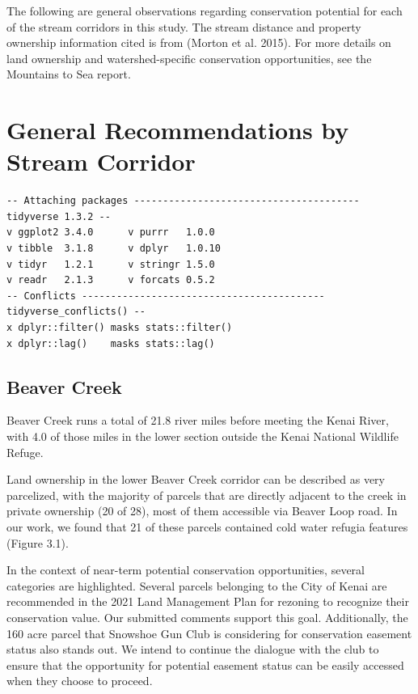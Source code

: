 \documentclass[
  letterpaper,
  DIV=11,
  numbers=noendperiod]{scrreprt}
\begin{document}
The following are general observations regarding conservation potential
for each of the stream corridors in this study. The stream distance and
property ownership information cited is from (Morton et al. 2015). For
more details on land ownership and watershed-specific conservation
opportunities, see the Mountains to Sea report.

\hypertarget{general-recommendations-by-stream-corridor}{%
\section{General Recommendations by Stream
Corridor}\label{general-recommendations-by-stream-corridor}}

\begin{verbatim}
-- Attaching packages --------------------------------------- tidyverse 1.3.2 --
v ggplot2 3.4.0      v purrr   1.0.0 
v tibble  3.1.8      v dplyr   1.0.10
v tidyr   1.2.1      v stringr 1.5.0 
v readr   2.1.3      v forcats 0.5.2 
-- Conflicts ------------------------------------------ tidyverse_conflicts() --
x dplyr::filter() masks stats::filter()
x dplyr::lag()    masks stats::lag()
\end{verbatim}

\hypertarget{beaver-creek}{%
\subsection{Beaver Creek}\label{beaver-creek}}

Beaver Creek runs a total of 21.8 river miles before meeting the Kenai
River, with 4.0 of those miles in the lower section outside the Kenai
National Wildlife Refuge.

Land ownership in the lower Beaver Creek corridor can be described as
very parcelized, with the majority of parcels that are directly adjacent
to the creek in private ownership (20 of 28), most of them accessible
via Beaver Loop road. In our work, we found that 21 of these parcels
contained cold water refugia features (Figure 3.1).

In the context of near-term potential conservation opportunities,
several categories are highlighted. Several parcels belonging to the
City of Kenai are recommended in the 2021 Land Management Plan for
rezoning to recognize their conservation value. Our submitted comments
support this goal. Additionally, the 160 acre parcel that Snowshoe Gun
Club is considering for conservation easement status also stands out. We
intend to continue the dialogue with the club to ensure that the
opportunity for potential easement status can be easily accessed when
they choose to proceed.
\end{document}
